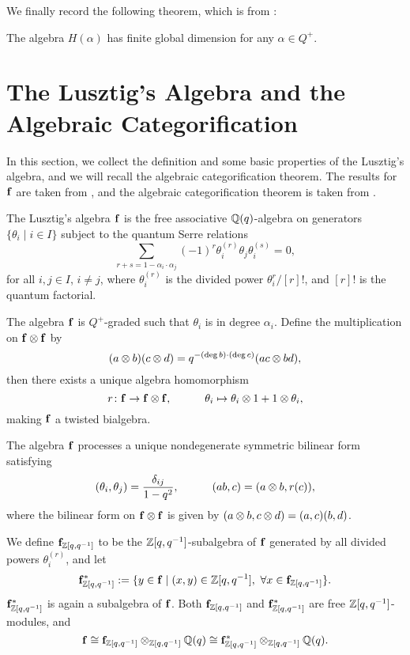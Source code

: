 We finally record the following theorem, which is from \cite[Corollary 2.9]{K}:

\begin{theorem}
    The algebra $H(\alpha)$ has finite global dimension for any $\alpha\in Q^+$.
\end{theorem}

\section{The Lusztig's Algebra and the Algebraic Categorification}

In this section, we collect the definition and some basic properties of the Lusztig's algebra,
and we will recall the algebraic categorification theorem. The results for 
$\mathbf{f}$ are taken from \cite{L}, and the algebraic categorification theorem
is taken from \cite{KL1}.

\begin{definition}
    The Lusztig's algebra $\mathbf{f}$ is the free associative $\mathbb{Q}(q)$-algebra
    on generators $\{\theta_{i}\mid i\in I\}$ subject to the quantum Serre relations
    \[
        \sum_{r+s = 1-\alpha_i\cdot\alpha_j}(-1)^r\theta_i^{(r)}\theta_j\theta_i^{(s)} = 0,
    \]
    for all $i,j\in I$, $i\ne j$, where $\theta_i^{(r)}$ is the divided power
    $\theta_i^r/[r]!$, and $[r]!$ is the quantum factorial.
\end{definition}

The algebra $\mathbf{f}$ is $Q^+$-graded such that $\theta_i$ is in degree $\alpha_i$.
Define the multiplication on $\mathbf{f}\otimes\mathbf{f}$ by $$(a\otimes b)(c\otimes d)
 = q^{-(\deg b)\cdot(\deg c)}(ac\otimes bd),$$ then there exists a unique algebra
homomorphism $$r\colon\mathbf{f}\to\mathbf{f}\otimes\mathbf{f},\hspace{3em}\theta_i\mapsto\theta_i\otimes 1
+1\otimes \theta_i,$$ making $\mathbf{f}$ a twisted bialgebra.

The algebra $\mathbf{f}$ processes a unique nondegenerate symmetric bilinear form satisfying
\[
    (\theta_i,\theta_j) = \dfrac{\delta_{ij}}{1-q^2},\hspace{3em}
    (ab,c) = (a\otimes b,r(c)),
\] 
where the bilinear form on $\mathbf{f}\otimes \mathbf{f}$ is given by 
$(a\otimes b,c\otimes d) = (a,c)(b,d)$.

We define $\mathbf{f}_{\mathbb{Z}[q,q^{-1}]}$ to be the $\mathbb{Z}[q,q^{-1}]$-subalgebra of $\mathbf{f}$
generated by all divided powers $\theta_i^{(r)}$, and let 
\[
    \f_{\Z[q,q^{-1}]}^* := \{y\in\f\mid (x,y)\in\Z[q,q^{-1}],\ 
    \forall x\in\f_{\Z[q,q^{-1}]}\}.
\]
$\mathbf{f}_{\mathbb{Z}[q,q^{-1}]}^*$ is again a subalgebra
of $\mathbf{f}$. Both $\mathbf{f}_{\mathbb{Z}[q,q^{-1}]}$ and $\mathbf{f}_{\mathbb{Z}[q,q^{-1}]}^*$ are free
$\mathbb{Z}[q,q^{-1}]$-modules, and $$\mathbf{f}\cong\mathbf{f}_{\mathbb{Z}[q,q^{-1}]}\otimes_{\mathbb{Z}[q,q^{-1}]}\mathbb{Q}(q)
\cong\mathbf{f}_{\mathbb{Z}[q,q^{-1}]}^*\otimes_{\mathbb{Z}[q,q^{-1}]}\mathbb{Q}(q).$$

